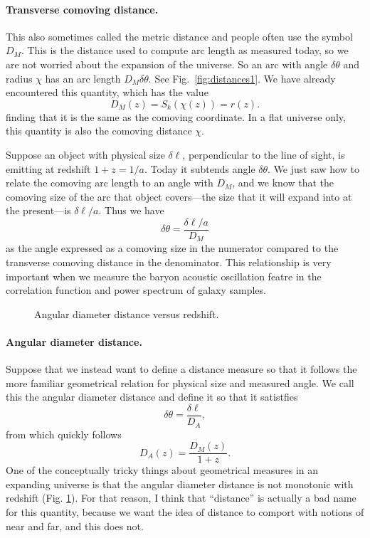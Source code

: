 \paragraph{Transverse comoving distance.}  This also sometimes called the metric distance and people often use the symbol $D_M$.  This is the distance used to compute arc length as measured today, so we are not worried about the expansion of the universe.  So an arc with angle $\delta\theta$ and radius $\chi$ has an arc length $D_M \delta\theta$.  See Fig.~\ref{fig:distances1}.  We have already encountered this quantity, which has the value
\begin{equation}
  D_M(z) = S_k(\chi(z)) = r(z).
\end{equation}
finding that it is the same as the comoving coordinate.  In a flat universe only, this quantity is also the comoving distance $\chi$.

Suppose an object with physical size $\delta\ell$, perpendicular to the line of sight, is emitting at redshift $1+z = 1/a$.  Today it  subtends angle $\delta\theta$.
We just saw how to relate the comoving arc length to an angle with $D_M$, and we know that the comoving size of the arc that object covers---the size that it will expand into at the present---is $\delta\ell/a$.  Thus we have
\begin{equation}
 \delta\theta =  \frac{\delta\ell/a}{D_M} 
\end{equation}
as the angle expressed as a comoving size in the numerator compared to the transverse comoving distance in the denominator.  This relationship is very important when we measure the baryon acoustic oscillation featre in the correlation function and power spectrum of galaxy samples.

\begin{figure}
  \caption{Angular diameter distance versus redshift.}
  \label{fig:angular_diameter_distance}
\end{figure}

\paragraph{Angular diameter distance.}    Suppose that we instead want to define a distance measure so that it follows the more familiar geometrical relation for physical size and measured angle.  We call this the angular diameter distance and define it so that it satistfies
\begin{equation}
  \delta\theta = \frac{\delta\ell}{D_A},
\end{equation}
from which quickly follows
\begin{equation}
  D_A(z) = \frac{D_M(z)}{1+z}.
\end{equation}
One of the conceptually tricky things about geometrical measures in an expanding universe is that the angular diameter distance is not monotonic with redshift (Fig. \ref{fig:angular_diameter_distance}).  For that reason, I think that ``distance'' is actually a bad name for this quantity, because we want the idea of distance to comport with notions of near and far, and this does not.


